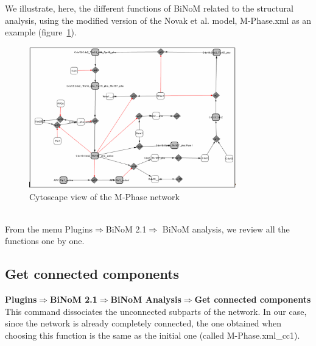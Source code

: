 We illustrate, here, the different functions of BiNoM related to the structural analysis, using the modified version of the Novak et al. model, M-Phase.xml as an example (figure~\ref{Cytoscape_view_of_the_M-Phase_network}).
\begin{figure}
\centering
\includegraphics[width=0.8\textwidth]{graphics/Cytoscape_view_of_the_M-Phase_network.png}
\caption{Cytoscape view of the M-Phase network}
\label{Cytoscape_view_of_the_M-Phase_network}
\end{figure}
\\From the menu Plugins$\Rightarrow$BiNoM 2.1$\Rightarrow$ BiNoM analysis, we review all the functions one by one.

\subsection{Get connected components}
\textbf{Plugins$\Rightarrow$BiNoM 2.1$\Rightarrow$BiNoM Analysis$\Rightarrow$Get connected components}\\
This command dissociates the unconnected subparts of the network. In our case, since the network is already completely connected, the one obtained when choosing this function is the same as the initial one (called M-Phase.xml\_cc1).
